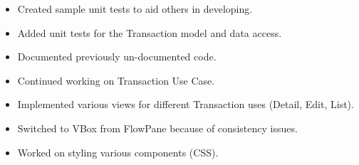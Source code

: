 \documentclass{article}
\begin{document}
  \begin{itemize}
    \item Created sample unit tests to aid others in developing.
    \item Added unit tests for the Transaction model and data access.
  \end{itemize}
	
  \begin{itemize}
    \item Documented previously un-documented code.
  \end{itemize}
  
  \begin{itemize}
    \item Continued working on Transaction Use Case.
    \item Implemented various views for different Transaction uses (Detail, Edit, List).
	\end{itemize}
	
	\begin{itemize}
    \item Switched to VBox from FlowPane because of consistency issues.
    \item Worked on styling various components (CSS).
	\end{itemize}
\end{document}
